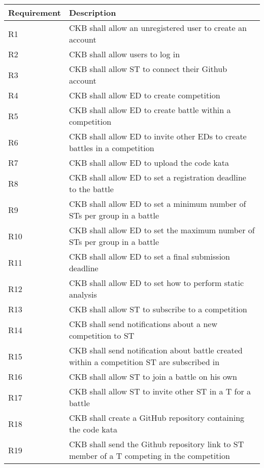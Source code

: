 \begin{longtable}{|p{3cm}|p{10cm}|}
        \hline
        \textbf{Requirement} & \textbf{Description} \\
        \hline
        R1 & CKB shall allow an unregistered user to create an account \\
        \hline
        R2 & CKB shall allow users to log in \\
        \hline
        R3 & CKB shall allow ST to connect their Github account \\
        \hline
        R4 & CKB shall allow ED to create competition \\
        \hline
        R5 & CKB shall allow ED to create battle within a competition \\
        \hline
        R6 & CKB shall allow ED to invite other EDs to create battles in a competition \\
        \hline
        R7 & CKB shall allow ED to upload the code kata \\
        \hline
        R8 & CKB shall allow ED to set a registration deadline to the battle \\
        \hline
        R9 & CKB shall allow ED to set a minimum number of STs per group in a battle \\
        \hline
        R10 & CKB shall allow ED to set the maximum number of STs per group in a battle \\
        \hline
        R11 & CKB shall allow ED to set a final submission deadline \\
        \hline
        R12 & CKB shall allow ED to set how to perform static analysis \\
        \hline
        R13 & CKB shall allow ST to subscribe to a competition \\
        \hline
        R14 & CKB shall send notifications about a new competition to ST \\
        \hline
        R15 & CKB shall send notification about battle created within a competition ST are subscribed in \\
        \hline
        R16 & CKB shall allow ST to join a battle on his own \\
        \hline
        R17 & CKB shall allow ST to invite other ST in a T for a battle \\
        \hline
        R18 & CKB shall create a GitHub repository containing the code kata \\
        \hline
        R19 & CKB shall send the Github repository link to ST member of a T competing in the competition \\

\end{longtable}
